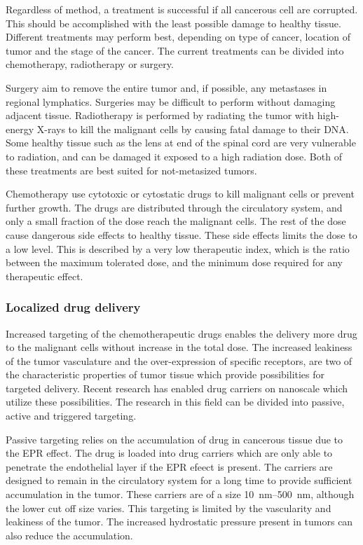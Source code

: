 Regardless of method, a treatment is successful if all cancerous cell are corrupted. This should be accomplished with the least possible damage to healthy tissue. Different treatments may perform best, depending on type of cancer, location of tumor and the stage of the cancer. The current treatments can be divided into chemotherapy, radiotherapy or surgery.  

Surgery aim to remove the entire tumor and, if possible, any metastases in regional lymphatics. Surgeries may be difficult to perform without damaging adjacent tissue. Radiotherapy is performed by radiating the tumor with high-energy X-rays to kill the malignant cells by causing fatal damage to their DNA. Some healthy tissue such as the lens at end of the spinal cord are very vulnerable to radiation, and can be damaged it exposed to a high radiation dose. Both of these treatments are best suited for not-metasized tumors. 

Chemotherapy use cytotoxic or cytostatic drugs to kill malignant cells or prevent further growth. The drugs are distributed through the circulatory system, and only a small fraction of the dose reach the malignant cells. The rest of the dose cause dangerous side effects to healthy tissue\cite{doi:10.1056/NEJM200106283442607}. These side effects limits the dose to a low level. This is described by a very low therapeutic index, which is the ratio between the maximum tolerated dose, and the minimum dose required for any therapeutic effect. 
 
\subsubsection{Localized drug delivery}
Increased targeting of the chemotherapeutic drugs enables the delivery more drug to the malignant cells without increase in the total dose.  The increased leakiness of the tumor vasculature and the over-expression of specific receptors, are two of the characteristic properties of tumor tissue which provide possibilities for targeted delivery. Recent research has enabled drug carriers on nanoscale which utilize these possibilities\cite{Jafari}. The research in this field can be divided into passive, active and triggered targeting. 


Passive targeting relies on the accumulation of drug in cancerous tissue due to the EPR effect. The drug is loaded into drug carriers which are only able to penetrate the endothelial layer if the EPR efeect is present\cite{Andresen2010}. The carriers are designed to remain in the circulatory system for a long time to provide sufficient accumulation in the tumor. These carriers are of a size \SIrange{10}{500}{\nano\meter}, although the lower cut off size varies\cite{Hofmann}. This targeting is limited by the vascularity and leakiness of the tumor. The increased hydrostatic pressure present in tumors can also reduce the accumulation\cite{Bae2009}.  

